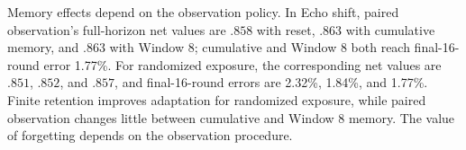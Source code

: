 Memory effects depend on the observation policy. In Echo shift, paired observation's full-horizon net values are $.858$ with reset, $.863$ with cumulative memory, and $.863$ with Window 8; cumulative and Window 8 both reach final-16-round error 1.77\%. For randomized exposure, the corresponding net values are $.851$, $.852$, and $.857$, and final-16-round errors are 2.32\%, 1.84\%, and 1.77\%. Finite retention improves adaptation for randomized exposure, while paired observation changes little between cumulative and Window 8 memory. The value of forgetting depends on the observation procedure.
